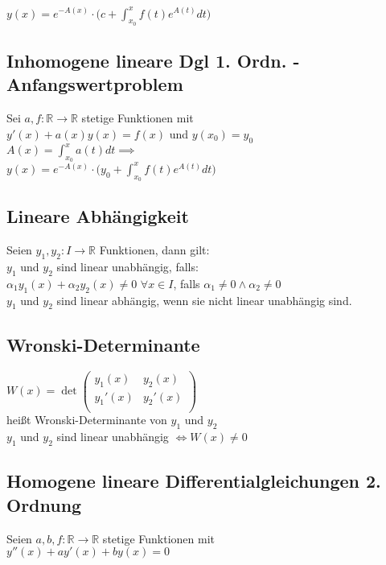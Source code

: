 \documentclass[a4paper,9pt]{extarticle}
\begin{document}
	$y(x) = e^{-A(x)} ⋅ \Big( c + \int_{x_0}^x f(t)e^{A(t)} dt \Big) $ \\
	
	\subsection*{Inhomogene lineare Dgl 1. Ordn. - Anfangswertproblem}
	Sei $a,f : \mathbb{R} → \mathbb{R}$ stetige Funktionen mit \\
	$y'(x) + a(x)y(x) = f(x)$ und $y(x_0) = y_0$ \\
	$A(x) = \int_{x_0}^x a(t) dt \implies$ \\
	
	$y(x) = e^{-A(x)} ⋅ \Big(y_0 + \int_{x_0}^x f(t)e^{A(t)} dt \Big) $
	
	\subsection*{Lineare Abhängigkeit}
	Seien $y_1,y_2 : I → \mathbb{R}$ Funktionen, dann gilt: \\
	$y_1$ und $y_2$ sind linear unabhängig, falls: \\
	$\alpha_1y_1(x) + \alpha_2y_2(x) ≠ 0$ $\forall x \in I$, falls $\alpha_1 ≠ 0 \land \alpha_2 ≠ 0$ \\
	$y_1$ und $y_2$ sind linear abhängig, wenn sie nicht linear unabhängig sind.
	
	\subsection*{Wronski-Determinante}
	$W(x) = \det \begin{pmatrix}
		y_1(x) & y_2(x) \\
		y_1'(x) & y_2'(x) \\
	\end{pmatrix}$ \\
	heißt Wronski-Determinante von $y_1$ und $y_2$ \\
	
	$y_1$ und $y_2$ sind linear unabhängig $\iff W(x) ≠ 0$
	
	\subsection*{Homogene lineare Differentialgleichungen 2. Ordnung}
	Seien $a,b,f : \mathbb{R} → \mathbb{R}$ stetige Funktionen mit \\
	$y''(x) + ay'(x) + by(x) = 0$	\\
	
\end{document}

